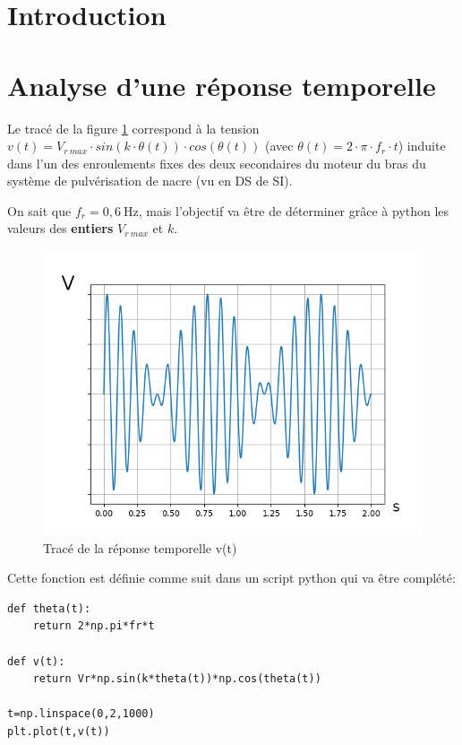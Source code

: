 

\section{Introduction}


\section{Analyse d'une réponse temporelle}

Le tracé de la figure \ref{fig01} correspond à la tension $v(t)=V_{r\ max}\cdot sin(k\cdot \theta(t))\cdot cos(\theta(t))$ (avec $\theta(t)=2\cdot \pi\cdot f_r\cdot t$) induite dans l'un des enroulements fixes des deux secondaires du moteur du bras du système de pulvérisation de nacre (vu en DS de SI).

On sait que $f_r=0,6~\textrm{Hz}$, mais l'objectif va être de déterminer grâce à python les valeurs des \textbf{entiers} $V_{r\ max}$ et $k$.

\begin{figure}[!ht]
\centering\includegraphics[width=0.7\linewidth]{img/fig01}
\caption{Tracé de la réponse temporelle v(t)}
\label{fig01}
\end{figure}

Cette fonction est définie comme suit dans un script python qui va être complété:
\begin{center}
\begin{verbatim}
def theta(t):
    return 2*np.pi*fr*t

def v(t):
    return Vr*np.sin(k*theta(t))*np.cos(theta(t))

t=np.linspace(0,2,1000)
plt.plot(t,v(t))
\end{verbatim}
\end{center}

